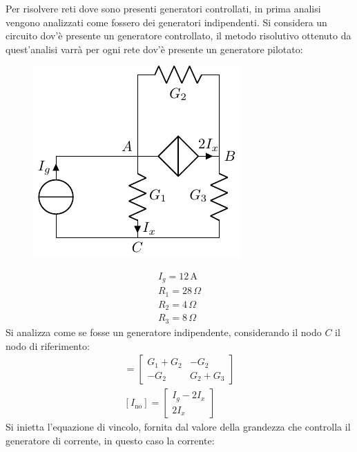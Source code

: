 \documentclass{article}
\newcommand{\SI}[1]{\mathrm{#1}}
\numberwithin{equation}{subsection}
\begin{document}
Per risolvere reti dove sono presenti generatori controllati, in prima analisi vengono analizzati come fossero dei generatori indipendenti. 
Si considera un circuito dov'è presente un generatore controllato, il metodo risolutivo ottenuto da quest'analisi varrà per ogni rete dov'è presente un generatore pilotato: 
\begin{figure}[H]%
    \centering
    \includegraphics{circuito-6.pdf}%
    \label{fig:circuito-6}
\end{figure}
\begin{gather*}
    I_g=12\,\SI{A}\\
    R_1=28\,\Omega\\
    R_2=4\,\Omega\\
    R_3=8\,\Omega
\end{gather*}
Si analizza come se fosse un generatore indipendente, considerando il nodo $C$ il nodo di riferimento:
\begin{gather*}
    [G_\mathrm{no}]=\begin{bmatrix}
        G_1+G_2&-G_2\\
        -G_2&G_2+G_3
    \end{bmatrix}\\
    [I_\mathrm{no}]=\begin{bmatrix}
        I_g-2I_x\\
        2I_x
    \end{bmatrix}
\end{gather*}
Si inietta l'equazione di vincolo, fornita dal valore della grandezza che controlla il generatore di corrente, in questo caso la corrente: 
\end{document}

